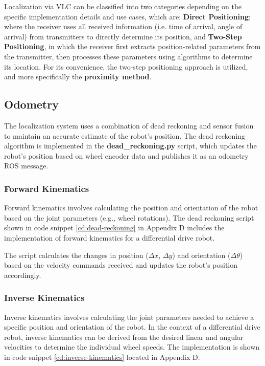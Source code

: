 \newpage

Localization via VLC can be classified into two categories depending on the specific implementation details and use cases, which are: \textbf{Direct Positioning}; where the receiver uses all received information (i.e. time of arrival, angle of arrival) from transmitters to directly determine its position, and \textbf{Two-Step Positioning}, in which the receiver first extracts position-related parameters from the transmitter, then processes these parameters using algorithms to determine its location. 
For its convenience, the two-step positioning approach is utilized, and more specifically the \textbf{proximity method}.%

\subsection{Odometry}
The localization system uses a combination of dead reckoning and sensor fusion to maintain an accurate estimate of the robot's position. The dead reckoning algorithm is implemented in the \textbf{dead\_reckoning.py} script, which updates the robot's position based on wheel encoder data and publishes it as an odometry ROS message.

\subsubsection{Forward Kinematics}
Forward kinematics involves calculating the position and orientation of the robot based on the joint parameters (e.g., wheel rotations). The dead reckoning script shown in code snippet \ref{cd:dead-reckoning} in Appendix D includes the implementation of forward kinematics for a differential drive robot.


The script calculates the changes in position ($\Delta x$, $\Delta y$) and orientation ($\Delta \theta$) based on the velocity commands received and updates the robot's position accordingly.

\subsubsection{Inverse Kinematics}
Inverse kinematics involves calculating the joint parameters needed to achieve a specific position and orientation of the robot. In the context of a differential drive robot, inverse kinematics can be derived from the desired linear and angular velocities to determine the individual wheel speeds. The implementation is shown in code snippet \ref{cd:inverse-kinematics} located in Appendix D.



